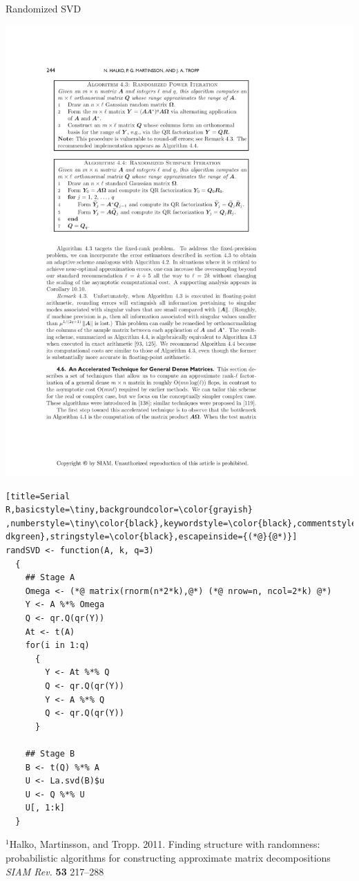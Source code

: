 \begin{frame}[fragile]
\begin{block}{Randomized SVD\footnotemark}
\begin{minipage}{.55\textwidth}
\begin{center}
      \includegraphics[height=.35\textheight]{../common/pics/randsvd/randSVDalg4_4}
    \end{center}
  \end{minipage}
  \begin{minipage}{0.430\textwidth}
\begin{lstlisting}[title=Serial 
R,basicstyle=\tiny,backgroundcolor=\color{grayish} 
,numberstyle=\tiny\color{black},keywordstyle=\color{black},commentstyle=\color{ 
dkgreen},stringstyle=\color{black},escapeinside={(*@}{@*)}]
randSVD <- function(A, k, q=3)
  {
    ## Stage A
    Omega <- (*@ matrix(rnorm(n*2*k),@*) (*@ nrow=n, ncol=2*k) @*)
    Y <- A %*% Omega
    Q <- qr.Q(qr(Y))
    At <- t(A)
    for(i in 1:q)
      {
        Y <- At %*% Q
        Q <- qr.Q(qr(Y))
        Y <- A %*% Q
        Q <- qr.Q(qr(Y))
      }
    
    ## Stage B
    B <- t(Q) %*% A
    U <- La.svd(B)$u
    U <- Q %*% U
    U[, 1:k]
  }
\end{lstlisting} %
{\fontsize{6pt}{10}\selectfont $^1$Halko, Martinsson, 
  and Tropp. 2011. Finding structure with randomness: probabilistic
  algorithms  for constructing approximate matrix decompositions
  \emph{SIAM Rev.} \textbf{53} 217--288}
\end{minipage}
\end{block}
\end{frame}


